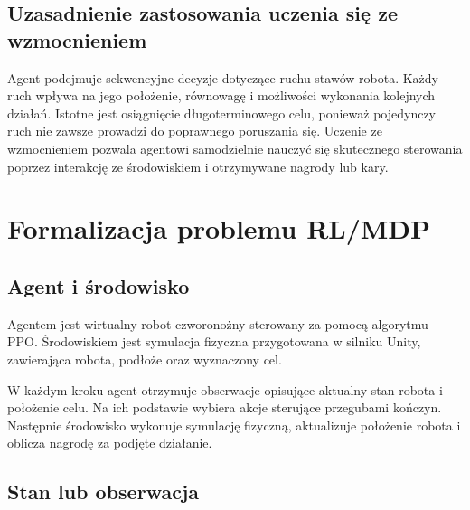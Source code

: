 \documentclass[12pt]{article}
\begin{document}
\subsection{Uzasadnienie zastosowania uczenia się ze wzmocnieniem}

Agent podejmuje sekwencyjne decyzje dotyczące ruchu stawów robota. 
Każdy ruch wpływa na jego położenie, równowagę i możliwości wykonania 
kolejnych działań. Istotne jest osiągnięcie długoterminowego celu, 
ponieważ pojedynczy ruch nie zawsze prowadzi do poprawnego poruszania się. 
Uczenie ze wzmocnieniem pozwala agentowi samodzielnie nauczyć się skutecznego 
sterowania poprzez interakcję ze środowiskiem i otrzymywane nagrody lub kary.

\section{Formalizacja problemu RL/MDP}

\subsection{Agent i środowisko}

Agentem jest wirtualny robot czworonożny sterowany za pomocą
algorytmu PPO. Środowiskiem jest symulacja fizyczna
przygotowana w silniku Unity, zawierająca robota, podłoże
oraz wyznaczony cel.

W każdym kroku agent otrzymuje obserwacje opisujące aktualny
stan robota i położenie celu. Na ich podstawie wybiera akcje
sterujące przegubami kończyn. Następnie środowisko wykonuje
symulację fizyczną, aktualizuje położenie robota i oblicza
nagrodę za podjęte działanie.

\subsection{Stan lub obserwacja}
\end{document}
